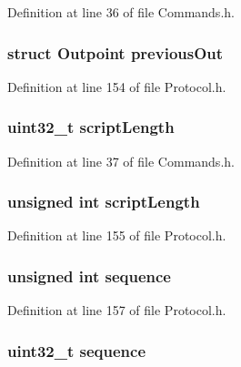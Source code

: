 Definition at line 36 of file Commands.h.

\hypertarget{struct_tranx_in_a2889e84785c9df5cba88abaaa03eb206}{
\subsubsection[{previousOut}]{\setlength{\rightskip}{0pt plus 5cm}struct {\bf Outpoint} {\bf previousOut}}}
\label{struct_tranx_in_a2889e84785c9df5cba88abaaa03eb206}


Definition at line 154 of file Protocol.h.

\hypertarget{struct_tranx_in_a756d651ccdd4c06f59685e337cf2e840}{
\subsubsection[{scriptLength}]{\setlength{\rightskip}{0pt plus 5cm}uint32\_\-t {\bf scriptLength}}}
\label{struct_tranx_in_a756d651ccdd4c06f59685e337cf2e840}


Definition at line 37 of file Commands.h.

\hypertarget{struct_tranx_in_a00601157399e1c73bddee66c716926f4}{
\subsubsection[{scriptLength}]{\setlength{\rightskip}{0pt plus 5cm}unsigned int {\bf scriptLength}}}
\label{struct_tranx_in_a00601157399e1c73bddee66c716926f4}


Definition at line 155 of file Protocol.h.

\hypertarget{struct_tranx_in_a18ec6560d3738f9c1bc8ed50f2e570c1}{
\subsubsection[{sequence}]{\setlength{\rightskip}{0pt plus 5cm}unsigned int {\bf sequence}}}
\label{struct_tranx_in_a18ec6560d3738f9c1bc8ed50f2e570c1}


Definition at line 157 of file Protocol.h.

\hypertarget{struct_tranx_in_a0ab03ef2cc38198d3666a992a245fddf}{
\subsubsection[{sequence}]{\setlength{\rightskip}{0pt plus 5cm}uint32\_\-t {\bf sequence}}}
\label{struct_tranx_in_a0ab03ef2cc38198d3666a992a245fddf}



